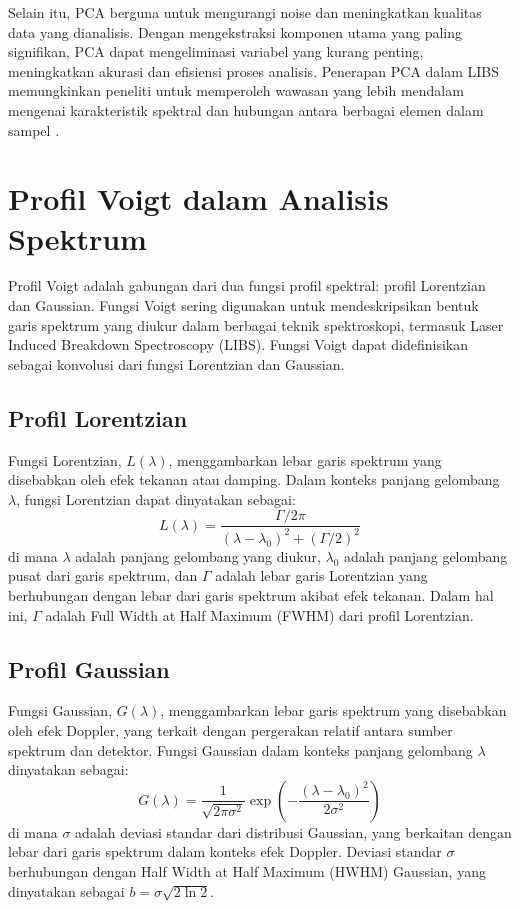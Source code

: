 \par Selain itu, PCA berguna untuk mengurangi noise dan meningkatkan kualitas data yang dianalisis. Dengan mengekstraksi komponen utama yang paling signifikan, PCA dapat mengeliminasi variabel yang kurang penting, meningkatkan akurasi dan efisiensi proses analisis. Penerapan PCA dalam LIBS memungkinkan peneliti untuk memperoleh wawasan yang lebih mendalam mengenai karakteristik spektral dan hubungan antara berbagai elemen dalam sampel \citep{lee2015}.

\section{Profil Voigt dalam Analisis Spektrum}
\par Profil Voigt adalah gabungan dari dua fungsi profil spektral: profil Lorentzian dan Gaussian. Fungsi Voigt sering digunakan untuk mendeskripsikan bentuk garis spektrum yang diukur dalam berbagai teknik spektroskopi, termasuk Laser Induced Breakdown Spectroscopy (LIBS). Fungsi Voigt dapat didefinisikan sebagai konvolusi dari fungsi Lorentzian dan Gaussian.

\subsection{Profil Lorentzian}
\par Fungsi Lorentzian, \( L(\lambda) \), menggambarkan lebar garis spektrum yang disebabkan oleh efek tekanan atau damping. Dalam konteks panjang gelombang \( \lambda \), fungsi Lorentzian dapat dinyatakan sebagai:
\begin{equation}
L(\lambda) = \frac{\Gamma / 2\pi}{(\lambda - \lambda_0)^2 + (\Gamma / 2)^2}
\end{equation}
di mana \( \lambda \) adalah panjang gelombang yang diukur, \( \lambda_0 \) adalah panjang gelombang pusat dari garis spektrum, dan \( \Gamma \) adalah lebar garis Lorentzian yang berhubungan dengan lebar dari garis spektrum akibat efek tekanan. Dalam hal ini, \( \Gamma \) adalah Full Width at Half Maximum (FWHM) dari profil Lorentzian.

\subsection{Profil Gaussian}
\par Fungsi Gaussian, \( G(\lambda) \), menggambarkan lebar garis spektrum yang disebabkan oleh efek Doppler, yang terkait dengan pergerakan relatif antara sumber spektrum dan detektor. Fungsi Gaussian dalam konteks panjang gelombang \( \lambda \) dinyatakan sebagai:
\begin{equation}
G(\lambda) = \frac{1}{\sqrt{2\pi \sigma^2}} \exp\left(-\frac{(\lambda - \lambda_0)^2}{2\sigma^2}\right)
\end{equation}
di mana \( \sigma \) adalah deviasi standar dari distribusi Gaussian, yang berkaitan dengan lebar dari garis spektrum dalam konteks efek Doppler. Deviasi standar \( \sigma \) berhubungan dengan Half Width at Half Maximum (HWHM) Gaussian, yang dinyatakan sebagai \( b = \sigma \sqrt{2 \ln 2} \).

